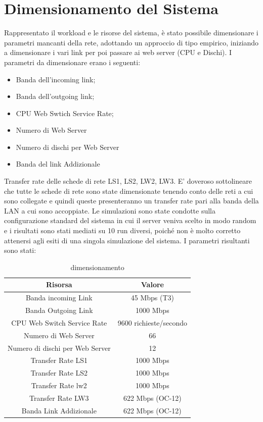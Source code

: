 \section{Dimensionamento del Sistema}
Rappresentato il workload e le risorse del sistema, è stato possibile dimensionare i parametri mancanti della rete, adottando un approccio di tipo empirico, iniziando a dimensionare i vari link per poi passare ai web server (CPU e Dischi). 
I parametri da dimensionare erano i seguenti:
\begin{itemize}
	\item Banda dell'incoming link;
	\item Banda dell'outgoing link;
	\item CPU Web Swtich Service Rate;
	\item Numero di Web Server
	\item Numero di dischi per Web Server
	\item Banda del link Addizionale
\end{itemize}
Transfer rate delle schede di rete LS1, LS2, LW2, LW3.
E' doveroso sottolineare che tutte le schede di rete sono state dimensionate tenendo conto delle reti a cui sono collegate e quindi queste presenteranno un transfer rate pari alla banda della LAN a cui sono accoppiate. Le simulazioni sono state condotte sulla configurazione standard del sistema in cui il server veniva scelto in modo random e  i risultati sono stati mediati su 10 run diversi, poiché non è molto corretto attenersi agli esiti di una singola simulazione del sistema. I parametri risultanti sono stati:
\begin{table}[H]
\begin{center}
\begin{tabular}{||c|c||}
\hline
Risorsa							&Valore\\
\hline
Banda incoming Link				&45 Mbps (T3)\\
\hline	
Banda Outgoing Link				&1000 Mbps\\
\hline
CPU Web Switch Service Rate		&9600 richieste/secondo\\
\hline
Numero di Web Server			&66\\
\hline
Numero di dischi per Web Server	&12\\
\hline
Transfer Rate LS1				&1000 Mbps\\
\hline
Transfer Rate LS2				&1000 Mbps\\
\hline
Transfer Rate lw2		&1000 Mbps\\
\hline
Transfer Rate LW3		&622 Mbps (OC-12)\\
\hline
Banda Link Addizionale	&622 Mbps (OC-12)\\
\hline
\end{tabular}
\end{center}
\caption{dimensionamento}
\label{test_4}
\end{table}

